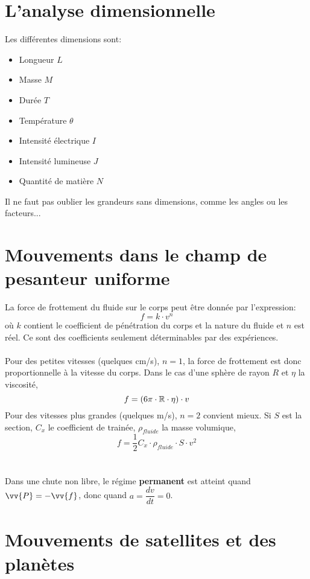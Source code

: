 \section{L'analyse dimensionnelle}

\begin{Definition}

Les différentes dimensions sont:
\begin{itemize}
\item Longueur $L$
\item Masse $M$
\item Durée $T$
\item Température $\theta$
\item Intensité électrique $I$
\item Intensité lumineuse $J$
\item Quantité de matière $N$
\end{itemize}
Il ne faut pas oublier les grandeurs sans dimensions, comme les angles ou les facteurs...
\end{Definition}


\section{Mouvements dans le champ de pesanteur uniforme}

\begin{Definition}

La force de frottement du fluide sur le corps peut être donnée par l'expression:
$$f=k\cdot v^n$$
où $k$ contient le coefficient de pénétration du corps et la nature du fluide et $n$ est réel. Ce sont des coefficients seulement déterminables par des expériences.\\\\
Pour des petites vitesses (quelques cm/s), $n=1$, la force de frottement est donc proportionnelle à la vitesse du corps. Dans le cas d'une sphère de rayon $R$ et $\eta$ la viscosité,
$$f=(6\pi\cdot\mathbb{R}\cdot\eta )\cdot v$$ 
Pour des vitesses plus grandes (quelques m/s), $n=2$ convient mieux. Si $S$ est la section, $C_{x}$ le coefficient de trainée, $\rho_{fluide}$ la masse volumique, 
$$ f=\frac{1}{2}C_{x}\cdot\rho_{fluide}\cdot S\cdot v^2 $$  \\\\
Dans une chute non libre, le régime \textbf{permanent} est atteint quand $\vv{P}=-\vv{f}$, donc quand $a=\dfrac{dv}{dt}=0$.  
\end{Definition}


\section{Mouvements de satellites et des planètes}

